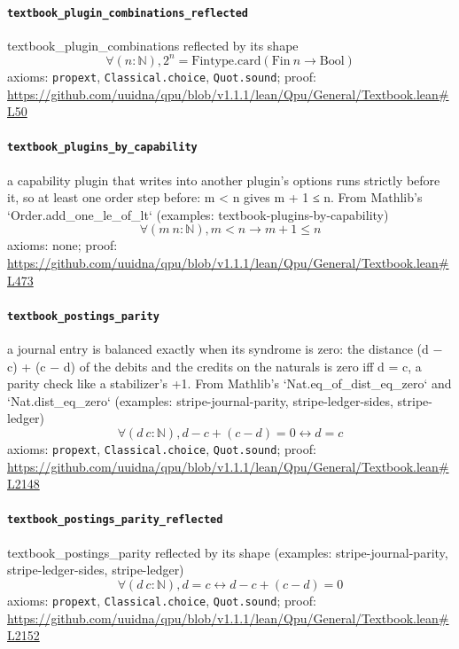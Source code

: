 \documentclass[11pt]{article}
\begin{document}
\paragraph{\texttt{textbook\_plugin\_combinations\_reflected}}
textbook\_plugin\_combinations reflected by its shape
\[ \forall (n : \mathbb{N}), 2 ^{n} = \mathrm{Fintype.card} (\mathrm{Fin}\ n \to \mathrm{Bool}) \]
\noindent axioms: \texttt{propext}, \texttt{Classical.choice}, \texttt{Quot.sound}; proof: \url{https://github.com/uuidna/qpu/blob/v1.1.1/lean/Qpu/General/Textbook.lean\#L50}

\paragraph{\texttt{textbook\_plugins\_by\_capability}}
a capability plugin that writes into another plugin's options runs strictly before it, so at least one order step before: m < n gives m + 1 ≤ n. From Mathlib's `Order.add\_one\_le\_of\_lt` (examples: textbook-plugins-by-capability)
\[ \forall (m\ n : \mathbb{N}), m < n \to m + 1 \le n \]
\noindent axioms: none; proof: \url{https://github.com/uuidna/qpu/blob/v1.1.1/lean/Qpu/General/Textbook.lean\#L473}

\paragraph{\texttt{textbook\_postings\_parity}}
a journal entry is balanced exactly when its syndrome is zero: the distance (d − c) + (c − d) of the debits and the credits on the naturals is zero iff d = c, a parity check like a stabilizer's +1. From Mathlib's `Nat.eq\_of\_dist\_eq\_zero` and `Nat.dist\_eq\_zero` (examples: stripe-journal-parity, stripe-ledger-sides, stripe-ledger)
\[ \forall (d\ c : \mathbb{N}), d - c + (c - d) = 0 \leftrightarrow d = c \]
\noindent axioms: \texttt{propext}, \texttt{Classical.choice}, \texttt{Quot.sound}; proof: \url{https://github.com/uuidna/qpu/blob/v1.1.1/lean/Qpu/General/Textbook.lean\#L2148}

\paragraph{\texttt{textbook\_postings\_parity\_reflected}}
textbook\_postings\_parity reflected by its shape (examples: stripe-journal-parity, stripe-ledger-sides, stripe-ledger)
\[ \forall (d\ c : \mathbb{N}), d = c \leftrightarrow d - c + (c - d) = 0 \]
\noindent axioms: \texttt{propext}, \texttt{Classical.choice}, \texttt{Quot.sound}; proof: \url{https://github.com/uuidna/qpu/blob/v1.1.1/lean/Qpu/General/Textbook.lean\#L2152}
\end{document}
